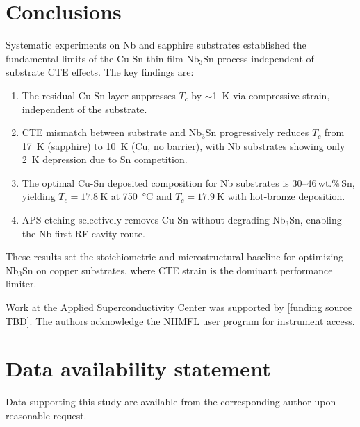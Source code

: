 \documentclass{iopjournal}
\begin{document}
\section{Conclusions}

Systematic experiments on Nb and sapphire substrates established the fundamental limits of the Cu-Sn thin-film Nb$_3$Sn process independent of substrate CTE effects. The key findings are:

\begin{enumerate}
    \item The residual Cu-Sn layer suppresses $T_c$ by $\sim$\qty{1}{\kelvin} via compressive strain, independent of the substrate.
    \item CTE mismatch between substrate and Nb$_3$Sn progressively reduces $T_c$ from \qty{17}{\kelvin} (sapphire) to \qty{10}{\kelvin} (Cu, no barrier), with Nb substrates showing only \qty{2}{\kelvin} depression due to Sn competition.
    \item The optimal Cu-Sn deposited composition for Nb substrates is 30--46\,wt.\%\,Sn, yielding $T_c = \qty{17.8}{\kelvin}$ at \qty{750}{\degreeCelsius} and $T_c = \qty{17.9}{\kelvin}$ with hot-bronze deposition.
    \item APS etching selectively removes Cu-Sn without degrading Nb$_3$Sn, enabling the Nb-first RF cavity route.
\end{enumerate}

These results set the stoichiometric and microstructural baseline for optimizing Nb$_3$Sn on copper substrates, where CTE strain is the dominant performance limiter.

\ack
Work at the Applied Superconductivity Center was supported by [funding source TBD]. The authors acknowledge the NHMFL user program for instrument access.

\section*{Data availability statement}
Data supporting this study are available from the corresponding author upon reasonable request.

\printbibliography
\end{document}

